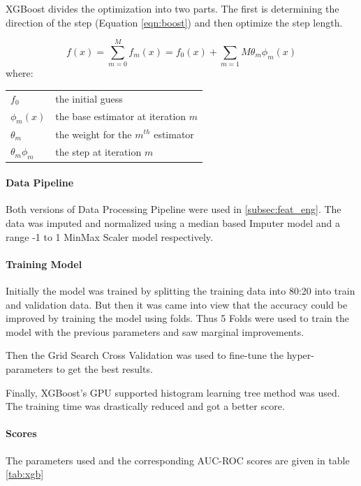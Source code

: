 \documentclass[sigconf, nonacm]{acmart}
\makeatletter
\newenvironment{conditions}
  {\par\vspace{\abovedisplayskip}\noindent\begin{tabular}{>{$}l<{$} @{${}={}$} l}}
  {\end{tabular}\par\vspace{\belowdisplayskip}}
\makeatother
\begin{document}
XGBoost divides the optimization into two parts. The first is determining the direction of the step (Equation \ref{eqn:boost}) and then optimize the step length.\cite{xgboost_2021}

\begin{equation}
	\label{eqn:boost}
	f(x) = \sum_{m=0}^{M} f_m (x) = f_0 (x) + \sum_{m=1}{M} \theta_{m} \phi_{m} (x)
\end{equation}\cite{gbm_2021}
where:
\begin{conditions}
	f_0                   &   the initial guess                   \\
	\phi_m (x)            &   the base estimator at iteration $m$ \\
	\theta_m              &   the weight for the $m^{th}$ estimator \\
	\theta_{m} \phi_{m}   &   the step at iteration $m$           \\
			    
\end{conditions}

\paragraph{Data Pipeline}
Both versions of Data Processing Pipeline were used in \ref{subsec:feat_eng}. The data was imputed and normalized using a median based Imputer model and a range -1 to 1 MinMax Scaler model respectively.

\paragraph{Training Model}
Initially the model was trained by splitting the training data into 80:20 into train and validation data. But then it was came into view that the accuracy could be improved by training the model using folds. Thus 5 Folds were used to train the model with the previous parameters and saw marginal improvements.

Then the Grid Search Cross Validation\cite{sklearn.model_selection.gridsearchcv} was used to fine-tune\cite{xgboost_parameters_2021} the hyper-parameters to get the best results.

Finally, XGBoost's GPU supported\cite{xgboost_gpu_support_2021} histogram learning tree method\cite{xgboost_tree_methods_2021} was used. The training time was drastically reduced and got a better score.

\paragraph{Scores}
The parameters used and the corresponding AUC-ROC scores are given in table \ref{tab:xgb}
\end{document}
